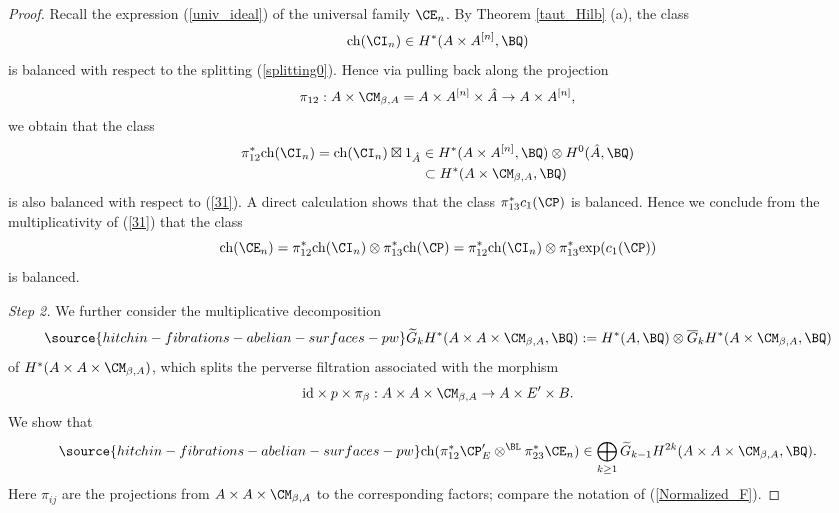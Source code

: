 \begin{proof}
Recall the expression (\ref{univ_ideal}) of the universal family $\CE_n$. By Theorem \ref{taut_Hilb} (a), the class
\[
\mathrm{ch}(\CI_n) \in  H^{\ast}(A\times A^{[n]}, \BQ)
\]
is balanced with respect to the splitting (\ref{splitting0}). Hence via pulling back along the projection
\[
\pi_{12}: A\times \CM_{\beta,A} = A\times A^{[n]} \times \hat{A} \to A \times A^{[n]},
\]
we obtain that the class
\[
\begin{split}
\pi_{12}^\ast \mathrm{ch}(\CI_n) =  \mathrm{ch}(\CI_n) \boxtimes 1_{\hat{A}} & \in H^\ast(A \times A^{[n]}, \BQ) \otimes H^0(\hat{A}, \BQ)\\  & \subset H^*(A\times \CM_{\beta,A}, \BQ)
\end{split}
\]
is also balanced with respect to (\ref{31}). A direct calculation shows that the class $\pi_{13}^\ast c_1(\CP)$ is balanced. Hence we conclude from the multiplicativity of (\ref{31}) that the class
\[
\mathrm{ch}(\CE_n) = \pi_{12}^\ast \mathrm{ch}(\CI_n) \otimes \pi_{13}^\ast \mathrm{ch}(\CP)=  \pi_{12}^\ast \mathrm{ch}(\CI_n) \otimes \pi_{13}^\ast \mathrm{exp}(c_1(\CP))
\]
is balanced.


 \emph{Step 2.} We further consider the multiplicative decomposition
\begin{equation}\label{32}
\source{hitchin-fibrations-abelian-surfaces-pw}
\widetilde{G}_k H^*(A \times A \times \CM_{\beta, A}, \BQ) := H^*(A, \BQ) \otimes \overline{G}_k H^*(A \times \CM_{\beta, A}, \BQ)
\end{equation}
of $H^*(A \times A \times \CM_{\beta, A})$, which splits the perverse filtration associated with the morphism
\[
\mathrm{id} \times p \times \pi_\beta: A \times A \times \CM_{\beta, A} \to A \times E'\times B.
\]
We show that
\begin{equation}\label{34}
\source{hitchin-fibrations-abelian-surfaces-pw}
\mathrm{ch}(\pi_{12}^\ast {\CP'_{E}} \otimes^{\BL} \pi_{23}^\ast \CE_n) \in \bigoplus_{k\geq 1}\widetilde{G}_{k-1} H^{2k}(A \times A\times \CM_{\beta, A}, \BQ).
\end{equation}
Here $\pi_{ij}$ are the projections from $A\times A \times \CM_{\beta,A}$ to the corresponding factors; compare the notation of (\ref{Normalized_F}).



\end{proof}
